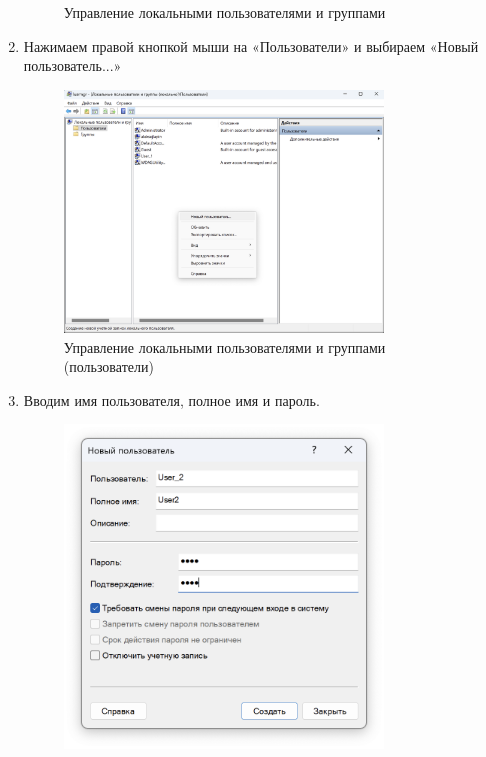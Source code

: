 \documentclass[a4paper, 14pt]{report}
\begin{document}
\begin{enumerate}
{\begin{figure}[H]
              \caption{Управление локальными пользователями и группами}
          \end{figure}
          }
    \item {Нажимаем правой кнопкой мыши на «Пользователи» и выбираем «Новый пользователь...»
          \begin{figure}[H]
              \centering
              \includegraphics[width=0.8\textwidth]{../images/lusrmgr_users.png}
              \caption{Управление локальными пользователями и группами (пользователи)}
          \end{figure}
          }
    \item {Вводим имя пользователя, полное имя и пароль.
          \begin{figure}[H]
              \centering
              \includegraphics[width=0.8\textwidth]{../images/lusrmgr_create_user.png}

\end{figure}}
\end{enumerate}
\end{document}
